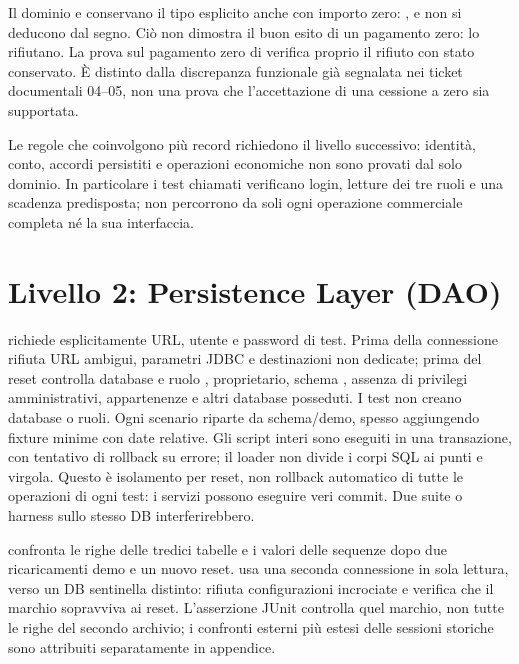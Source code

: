 Il dominio e  conservano il tipo esplicito anche con
importo zero: ,  e  non si deducono
dal segno. Ciò non dimostra il buon esito di un pagamento zero:
 lo rifiutano.
La prova sul pagamento zero di 
verifica proprio il rifiuto con stato conservato. È distinto dalla discrepanza
funzionale già segnalata nei ticket documentali 04--05, non una prova che
l'accettazione di una cessione a zero sia supportata.

Le regole che coinvolgono più record richiedono il livello successivo:
identità, conto, accordi persistiti e operazioni economiche non sono
provati dal solo dominio. In particolare i test chiamati
 verificano login, letture dei tre ruoli
e una scadenza predisposta; non percorrono da soli ogni operazione
commerciale completa né la sua interfaccia.

\section{Livello 2: Persistence Layer (DAO)}\label{sec:test-dao}
 richiede esplicitamente URL, utente e password di test.
Prima della connessione rifiuta URL ambigui, parametri JDBC e destinazioni
non dedicate; prima del reset controlla database e ruolo ,
proprietario, schema , assenza di privilegi amministrativi,
appartenenze e altri database posseduti. I test non creano database o ruoli.
Ogni scenario riparte da schema/demo, spesso aggiungendo fixture minime
con date relative. Gli script interi sono eseguiti in una transazione,
con tentativo di rollback su errore; il loader non divide i corpi SQL ai
punti e virgola. Questo è isolamento per reset, non rollback automatico
di tutte le operazioni di ogni test: i servizi possono eseguire veri commit.
Due suite o harness sullo stesso DB interferirebbero.

 confronta le righe delle tredici tabelle e i
valori delle sequenze dopo due ricaricamenti demo e un nuovo reset.
 usa una seconda connessione in
sola lettura, verso un DB sentinella distinto: rifiuta configurazioni
incrociate e verifica che il marchio  sopravviva ai reset.
L'asserzione JUnit controlla quel marchio, non tutte le righe del secondo
archivio; i confronti esterni più estesi delle sessioni storiche sono
attribuiti separatamente in appendice.

